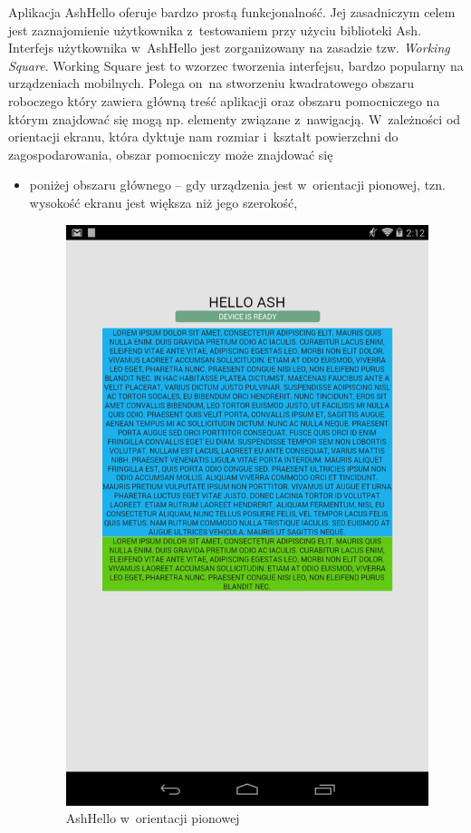 \documentclass[brudnopis]{xmgr}
\begin{document}
Aplikacja AshHello oferuje bardzo prostą funkcjonalność. Jej zasadniczym celem jest zaznajomienie użytkownika z~testowaniem przy użyciu biblioteki Ash. Interfejs użytkownika w~AshHello jest zorganizowany na zasadzie tzw. {\it Working Square}. Working Square jest to wzorzec tworzenia interfejsu, bardzo popularny na urządzeniach mobilnych. Polega on~na stworzeniu kwadratowego obszaru roboczego który zawiera główną treść aplikacji oraz obszaru pomocniczego na którym znajdować się mogą np. elementy związane z~nawigacją. W~zależności od orientacji ekranu, która dyktuje nam rozmiar i~kształt powierzchni do zagospodarowania, obszar pomocniczy może znajdować się 

\begin{itemize}
  \item poniżej obszaru głównego -- gdy urządzenia jest w~orientacji pionowej, tzn. wysokość ekranu jest większa niż jego szerokość,

\begin{figure}[h]
    \centering
    \includegraphics[scale=0.25]{hello1.png}
    \caption{AshHello w~orientacji pionowej}
    \label{fig:AshHello1}
\end{figure}


\end{itemize}
\end{document}

